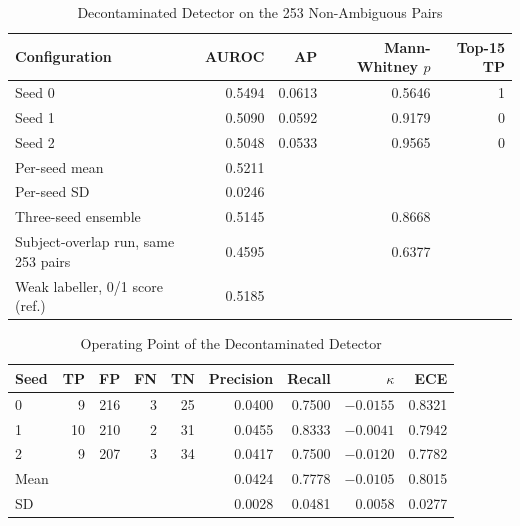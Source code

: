 \begin{table}[!htbp]
\caption{Decontaminated Detector on the 253 Non-Ambiguous Pairs}
\centering
\small
\setlength{\tabcolsep}{4pt}
\begin{tabular}{@{}lrrrr@{}}
\toprule
\textbf{Configuration} & \textbf{AUROC} & \textbf{AP} &
\textbf{Mann-Whitney $p$} & \textbf{Top-15 TP} \\
\midrule
Seed 0              & 0.5494 & 0.0613 & 0.5646 & 1 \\
Seed 1              & 0.5090 & 0.0592 & 0.9179 & 0 \\
Seed 2              & 0.5048 & 0.0533 & 0.9565 & 0 \\
Per-seed mean        & 0.5211 & & & \\
Per-seed SD          & 0.0246 & & & \\
Three-seed ensemble & 0.5145 & & 0.8668 & \\
\midrule
Subject-overlap run, same 253 pairs & 0.4595 & & 0.6377 & \\
Weak labeller, 0/1 score (ref.) & 0.5185 & & & \\
\bottomrule
\end{tabular}
\label{tab:decontam}
\end{table}

\begin{table}[!htbp]
\caption{Operating Point of the Decontaminated Detector}
\centering
\small
\begin{tabular}{lrrrrrrrr}
\toprule
\textbf{Seed} & \textbf{TP} & \textbf{FP} & \textbf{FN} & \textbf{TN} &
\textbf{Precision} & \textbf{Recall} & \textbf{$\kappa$} & \textbf{ECE} \\
\midrule
0            & 9  & 216 & 3 & 25 & 0.0400 & 0.7500 & $-0.0155$ & 0.8321 \\
1            & 10 & 210 & 2 & 31 & 0.0455 & 0.8333 & $-0.0041$ & 0.7942 \\
2            & 9  & 207 & 3 & 34 & 0.0417 & 0.7500 & $-0.0120$ & 0.7782 \\
\midrule
Mean         &    &     &   &    & 0.0424 & 0.7778 & $-0.0105$ & 0.8015 \\
SD           &    &     &   &    & 0.0028 & 0.0481 & 0.0058 & 0.0277 \\
\bottomrule
\end{tabular}
\label{tab:operating}
\end{table}

